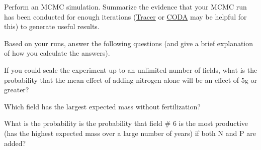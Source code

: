 \documentclass[11pt]{article}
\begin{document}
\begin{compactenum}
	\item Perform an MCMC simulation. Summarize the evidence that your MCMC run has been conducted for enough iterations (\href{http://tree.bio.ed.ac.uk/software/tracer/}{Tracer} or \href{http://cran.r-project.org/web/packages/coda/index.html}{CODA} may be helpful for this) to generate useful results.
	\item Based on your runs, answer the following questions (and give a brief explanation of how you calculate the answers).
	\begin{compactenum}
		\item If you could scale the experiment up to an unlimited number of fields, what is the probability that the mean effect of adding nitrogen alone will be an effect of 5g or greater?
		\item Which field has the largest expected mass without fertilization?  
		\item What is the probability is the probability that field \# 6 is the most productive (has the highest expected mass over a large number of years) if both N and P are added?
\end{compactenum}
		
\end{compactenum}
\end{document}
